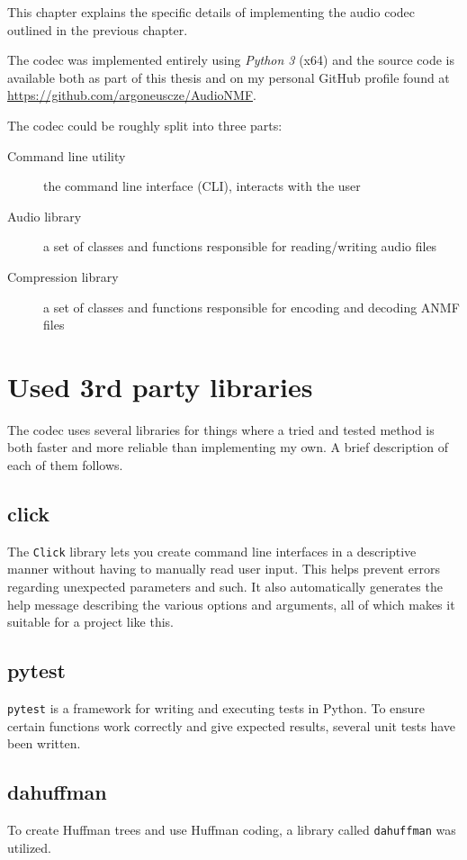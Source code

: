 This chapter explains the specific details of implementing the audio codec outlined in the previous chapter.

The codec was implemented entirely using \emph{Python 3} (x64) \cite{python3_ref} and the source code is available both as part of this thesis and on my personal GitHub profile found at \href{https://github.com/argoneuscze/AudioNMF}{https://github.com/argoneuscze/AudioNMF}.

The codec could be roughly split into three parts:

\begin{description}
	\item[Command line utility] the command line interface (CLI), interacts with the user
	\item[Audio library] a set of classes and functions responsible for reading/writing audio files
	\item[Compression library] a set of classes and functions responsible for encoding and decoding ANMF files
\end{description}

\section{Used 3rd party libraries}
The codec uses several libraries for things where a tried and tested method is both faster and more reliable than implementing my own. A brief description of each of them follows.

\subsection{click}
The \verb|Click| \cite{py_click} library lets you create command line interfaces in a descriptive manner without having to manually read user input. This helps prevent errors regarding unexpected parameters and such. It also automatically generates the help message describing the various options and arguments, all of which makes it suitable for a project like this.

\subsection{pytest}
\verb|pytest| \cite{py_pytest} is a framework for writing and executing tests in Python. To ensure certain functions work correctly and give expected results, several unit tests have been written.

\subsection{dahuffman}
To create Huffman trees and use Huffman coding, a library called \verb|dahuffman| \cite{py_dahuffman} was utilized.

